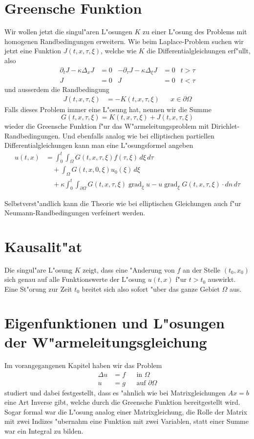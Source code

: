 \section{Greensche Funktion}
Wir wollen jetzt die singul"aren L"osungen $K$ zu einer L"osung des Problems
mit homogenen Randbedingungen erweitern.
Wie beim Laplace-Problem suchen wir jetzt eine Funktion $J(t,x,\tau,\xi)$,
welche wie $K$ die Differentialgleichungen erf"ullt, also
\begin{align*}
\partial_t J-\kappa\Delta_xJ&=0
&
-\partial_\tau J-\kappa\Delta_\xi J&=0
&t>\tau
\\
J&=0&J&=0&t<\tau
\end{align*}
und ausserdem die Randbedingung 
\begin{align*}
J(t,x,\tau,\xi)&=-K(t,x,\tau,\xi)&&x\in\partial\Omega
\end{align*}
Falls dieses Problem immer eine L"osung hat, nennen wir die
Summe
\[
G(t,x,\tau,\xi)=K(t,x,\tau,\xi)+J(t,x,\tau,\xi)
\]
wieder die Greensche Funktion f"ur das W"armeleitungsproblem
mit Dirichlet-Rand\-bedingungen. Und ebenfalls analog wie bei elliptischen
partiellen Differentialgleichungen kann man eine L"osungsformel
angeben
\begin{align*}
u(t,x)&=
\int_0^t\int_{\Omega}G(t,x,\tau,\xi)f(\tau,\xi)\,d\xi\,d\tau
\\
&\quad+\int_{\Omega}G(t,x,0,\xi)u_0(\xi)\,d\xi
\\
&\quad +\kappa\int_0^t\int_{\partial \Omega}
G(t,x,\tau,\xi)\operatorname{grad}_\xi u
-u\operatorname{grad}_\xi G(t,x,\tau,\xi)\cdot dn\,d\tau
\end{align*}

Selbstverst"andlich kann die Theorie wie bei elliptischen Gleichungen
auch f"ur Neumann-Randbedingungen verfeinert werden.

\section{Kausalit"at}
Die singul"are L"osung $K$ zeigt, dass eine "Anderung von $f$ an der Stelle
$(t_0,x_0)$ sich genau auf alle Funktionswerte der L"osung $u(t,x)$ f"ur
$t>t_0$ auswirkt. Eine St"orung zur Zeit $t_0$ breitet sich also sofort
"uber das ganze Gebiet $\Omega$ aus.

\section{Eigenfunktionen und L"osungen der W"armeleitungsgleichung}
Im vorangegangenen Kapitel haben wir das Problem
\begin{align*}
\Delta u&=f&&\text{in $\Omega$}\\
u&=g&&\text{auf $\partial\Omega$}
\end{align*}
studiert und dabei festgestellt, dass es "ahnlich wie bei Matrixgleichungen
$Ax=b$ eine Art Inverse gibt, welche durch die Greensche Funktion
bereitgestellt wird. Sogar formal war die L"osung analog einer Matrixgleichung,
die Rolle der Matrix mit zwei Indizes "ubernahm eine Funktion mit zwei
Variablen, statt einer Summe war ein Integral zu bilden.

